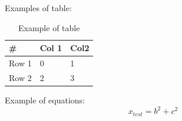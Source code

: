 \documentclass[12pt,a4paper,twoside]{book}
\begin{document}
Examples of table:
\begin{table}[h]
\centering
\begin{tabular}{|l|l|l|}
\hline
\#    & Col 1 & Col2 \\ \hline
Row 1 & 0     & 1    \\ \hline
Row 2 & 2     & 3    \\ \hline
\end{tabular}
\caption{Example of table}
\label{main:table_1}
\end{table}

Example of equations:
\begin{equation}
    x_{test} = b^2 + c^2
\end{equation}

 




\backmatter












\thispagestyle{empty}
\end{document}
